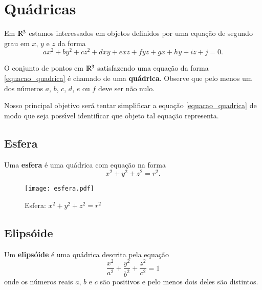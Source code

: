 
\chapter{Qu\'adricas} %
\label{cha:quadricas}

Em $\mathbb{R}^3$ estamos interessados em objetos definidos por uma equa\c{c}\~ao de segundo grau em $x$, $y$ e $z$ da forma
\begin{equation}\label{equacao_quadrica}
	ax^2 + by^2 + cz^2 + dxy + exz + fyz + gx + hy + iz + j = 0.
\end{equation}

O conjunto de pontos em $\mathbb{R}^3$ satisfazendo uma equa\c{c}\~ao da forma \eqref{equacao_quadrica} \'e chamado de uma \textbf{qu\'adrica}. Observe que pelo menos um dos n\'umeros $a$, $b$, $c$, $d$, $e$ ou $f$ deve ser n\~ao nulo.

Nosso principal objetivo ser\'a tentar simplificar a equa\c{c}\~ao \eqref{equacao_quadrica} de modo que seja poss{\'\i}vel identificar que objeto tal equa\c{c}\~ao representa.


\section{Esfera} %
\label{sec:esfera}
\begin{definicao}
	Uma \textbf{esfera} \'e uma qu\'adrica com equa\c{c}\~ao na forma
	\begin{equation}\label{equacao_esfera}
		x^2 + y^2 + z^2 = r^2.
	\end{equation}
\end{definicao}

\begin{figure}[h]
	\centering
	\caption{Esfera: $x^2 + y^2 + z^2 = r^2$}
	\texttt{[image: esfera.pdf]}
\end{figure}

\section{Elips\'oide} %
\label{sec:elipsoide}
\begin{definicao}
	Um \textbf{elips\'oide} \'e uma qu\'adrica descrita pela equa\c{c}\~ao
	\begin{equation}\label{equacao_elipsoide}
		\dfrac{x^2}{a^2} + \dfrac{y^2}{b^2} + \dfrac{z^2}{c^2} = 1
	\end{equation}
	onde os n\'umeros reais $a$, $b$ e $c$ s\~ao positivos e pelo menos dois deles s\~ao distintos.
\end{definicao}


